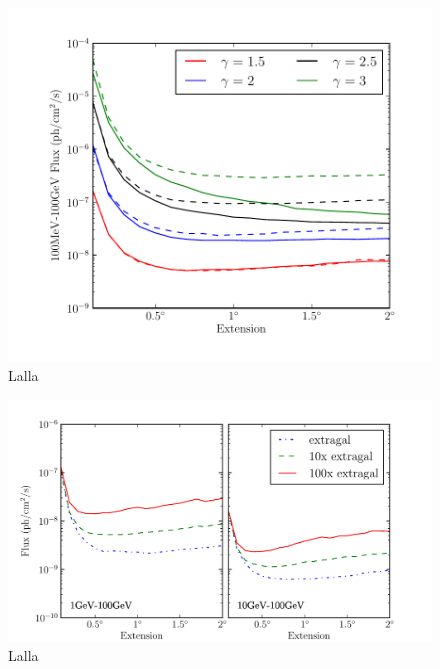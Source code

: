 \documentclass[preprint]{aastex}
\begin{document}
\clearpage

\begin{figure}
  \begin{center}
    \includegraphics{mc_plots/index_sensitivity.pdf}
    \end{center}
    \caption{Lalla}\label{index_sensitivity}
  \end{figure}

\clearpage

\begin{figure}
  \begin{center}
    \includegraphics{mc_plots/diff_factor_sensitivity.pdf}
    \end{center}
    \caption{Lalla}\label{diff_factor_sensitivity}
  \end{figure}
\end{document}
